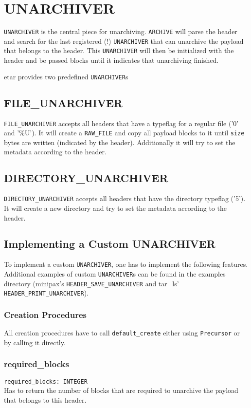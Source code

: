 \chapter{UNARCHIVER}
\lstinline;UNARCHIVER; is the central piece for unarchiving. \lstinline;ARCHIVE;
will parse the header and search for the last registered (!)
\lstinline;UNARCHIVER; that can unarchive the payload that belongs to the
header. This \lstinline;UNARCHIVER; will then be initialized with the header
and be passed blocks until it indicates that unarchiving finished.

etar provides two predefined \lstinline;UNARCHIVER;s

\section{FILE\_UNARCHIVER}
\lstinline;FILE_UNARCHIVER; accepts all headers that have a typeflag for a
regular file ('0' and '\%U'). It will create a \lstinline;RAW_FILE; and copy all
payload blocks to it until \lstinline;size; bytes are written (indicated by the
header). Additionally it will try to set the metadata according to the header.

\section{DIRECTORY\_UNARCHIVER}
\lstinline;DIRECTORY_UNARCHIVER; accepts all headers that have the directory
typeflag ('5'). It will create a new directory and try to set the metadata
according to the header.

\section{Implementing a Custom UNARCHIVER}
To implement a custom \lstinline;UNARCHIVER;, one has to implement the following
features. Additional examples of custom \lstinline;UNARCHIVER;s can be found in
the examples directory (minipax's \lstinline;HEADER_SAVE_UNARCHIVER; and
tar\_ls' \lstinline;HEADER_PRINT_UNARCHIVER;).

\subsection{Creation Procedures}
All creation procedures have to call \lstinline;default_create; either using
\lstinline;Precursor; or by calling it directly.

\subsection{required\_blocks}
\lstinline;required_blocks: INTEGER;\\
Has to return the number of blocks that are required to unarchive the payload
that belongs to this header.

